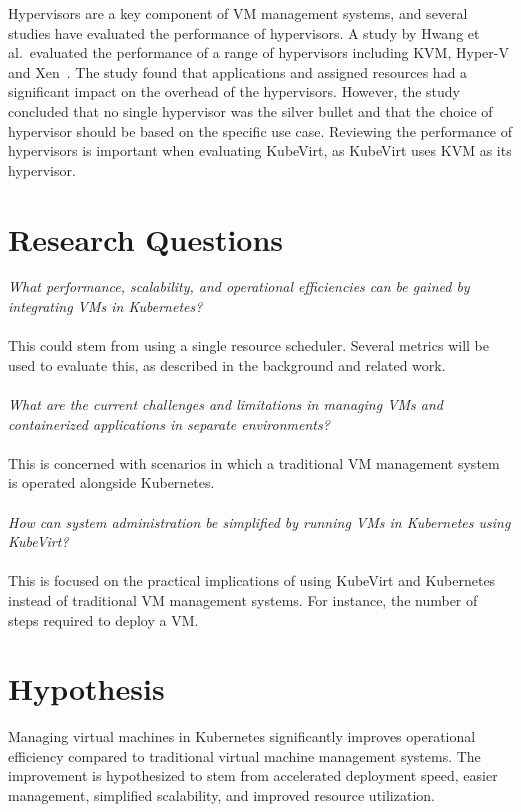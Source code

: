 \documentclass{article}
\begin{document}
Hypervisors are a key component of VM management systems, and several studies have evaluated the performance of hypervisors. A study by Hwang et al.\ evaluated the performance of a range of hypervisors including KVM, Hyper-V and Xen\ \cite{hypervisor-comparion-2010}. The study found that applications and assigned resources had a significant impact on the overhead of the hypervisors. However, the study concluded that no single hypervisor was the silver bullet and that the choice of hypervisor should be based on the specific use case. Reviewing the performance of hypervisors is important when evaluating KubeVirt, as KubeVirt uses KVM as its hypervisor. 


\section{Research Questions}
\noindent\textit{What performance, scalability, and operational efficiencies can be gained by integrating VMs in Kubernetes?}
\\\\
This could stem from using a single resource scheduler. Several metrics will be used to evaluate this, as described in the background and related work.
\\\\
\noindent\textit{What are the current challenges and limitations in managing VMs and containerized applications in separate environments?}
\\\\
This is concerned with scenarios in which a traditional VM management system is operated alongside Kubernetes.
\\\\
\noindent\textit{How can system administration be simplified by running VMs in Kubernetes using KubeVirt?}
\\\\
This is focused on the practical implications of using KubeVirt and Kubernetes instead of traditional VM management systems. For instance, the number of steps required to deploy a VM.


\section{Hypothesis}
Managing virtual machines in Kubernetes significantly improves operational efficiency compared to traditional virtual machine management systems. The improvement is hypothesized to stem from accelerated deployment speed, easier management, simplified scalability, and improved resource utilization.
\end{document}
